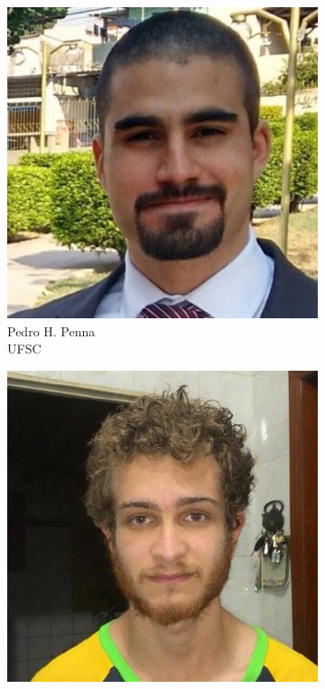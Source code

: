 \documentclass{beamer}
\begin{document}
\begin{frame}
			\begin{figure}[t]
				\captionsetup[subfigure]{
					justification=centering,
					labelformat=empty}
				\centering
					\begin{subfigure}{0.2\linewidth}
						\includegraphics[width=\linewidth]{pedro}
						\caption{\scriptsize{Pedro H. Penna\\UFSC}}
					\end{subfigure}
					\quad
					\quad
					\begin{subfigure}{0.2\linewidth}
						\includegraphics[width=\linewidth]{davidson}

\end{subfigure}
\end{figure}
\end{frame}
\end{document}
